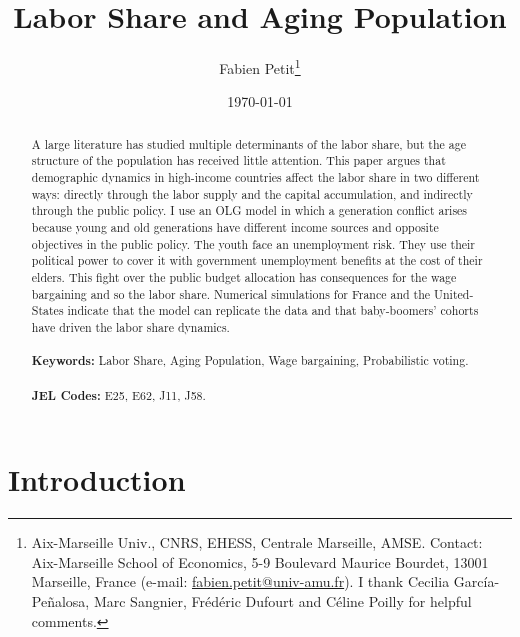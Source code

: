 \documentclass[12pt]{article}
\begin{document}
	
	\begin{titlepage}
		\title{Labor Share and Aging Population}
		\author{Fabien Petit\thanks{Aix-Marseille Univ., CNRS, EHESS, Centrale Marseille, AMSE. Contact: Aix-Marseille School of Economics, 5-9 Boulevard Maurice Bourdet, 13001 Marseille, France (e-mail: \href{mailto:fabien.petit@univ-amu.fr}{fabien.petit@univ-amu.fr}). I thank Cecilia García-Peñalosa, Marc Sangnier, Frédéric Dufourt and Céline Poilly for helpful comments.}}
		\date{\today}
		\maketitle
		\begin{abstract}
			\noindent A large literature has studied multiple determinants of the labor share, but the age structure of the population has received little attention. This paper argues that demographic dynamics in high-income countries affect the labor share in two different ways: directly through the labor supply and the capital accumulation, and indirectly through the public policy. I use an OLG model in which a generation conflict arises because young and old generations have different income sources and opposite objectives in the public policy. The youth face an unemployment risk. They use their political power to cover it with government unemployment benefits at the cost of their elders. This fight over the public budget allocation has consequences for the wage bargaining and so the labor share. Numerical simulations for France and the United-States indicate that the model can replicate the data and that baby-boomers' cohorts have driven the labor share dynamics.\\
			\vspace{0in}\\
			\noindent\textbf{Keywords:} Labor Share, Aging Population, Wage bargaining, Probabilistic voting.\\
			\vspace{0in}\\
			\noindent\textbf{JEL Codes:} E25, E62, J11, J58.\\
			
			\bigskip
		\end{abstract}
		\setcounter{page}{0}
		\thispagestyle{empty}
	\end{titlepage}
	\pagebreak \newpage
	
	\doublespacing
	
	\section{Introduction} \label{sec:introduction}
	
	
\end{document}
